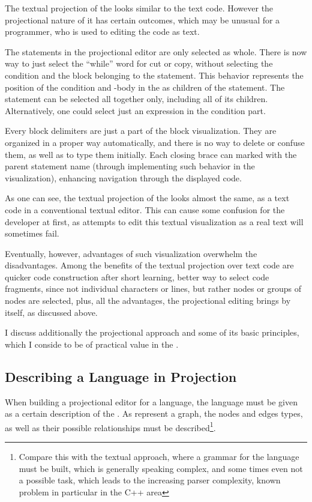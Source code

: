 The textual projection of the  looks similar to the text code. However the projectional 
nature of it has certain outcomes, which may be unusual for a programmer, who is used to editing
the code as text.

The statements in the projectional editor are only selected as whole. There is now way to just select 
the ``while'' word for cut or copy, without selecting the condition and the block belonging to the statement. 
This behavior represents the position of the condition and -body in the  as children of the  
statement. The statement can be selected all together only, including all of its children. Alternatively, one could 
select just an expression in the condition part.

Every block delimiters are just a part of the block visualization. They are organized in a proper way
automatically, and there is no way to delete or confuse them, as well as to type them initially. Each
closing brace can marked with the parent statement name (through implementing such behavior in the
 visualization), enhancing navigation through the displayed code.

As one can see, the textual projection of the  looks almost the same, as a text code in a 
conventional textual editor. This can cause some confusion for the developer at first, 
as attempts to edit this textual visualization as a real text will sometimes fail. 

Eventually, however, advantages of such visualization overwhelm the disadvantages. 
Among the benefits of the textual projection over text code are quicker code construction 
after short learning, better way to select code fragments, since not individual 
characters or lines, but rather  nodes or groups of nodes are selected, 
plus, all the advantages, the projectional editing brings by itself, as discussed above.

I discuss additionally the projectional approach and some of its basic 
principles, which I conside to be of practical value in the .


\subsection{Describing a Language in Projection}

When  building a projectional editor for a language, the language must be given as a certain description of the .
As  represent a graph, the nodes and edges types, as well as their possible relationships must be described\footnote{Compare this
with the textual approach, where a grammar for the language must be built, which is generally speaking complex, and some times even not a
possible task, which leads to the increasing parser complexity, known problem in particular in the C++ area}. 

